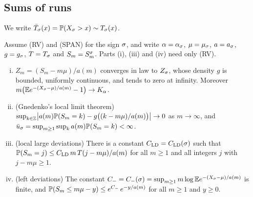 \subsection{Sums of runs}\label{sec:bulk-inputs}

We write $\bar T_\sigma(x)=\mathbb{P}(X_\sigma>x)\sim T_\sigma(x)$.

\begin{lemma}\label{lem:stable}
Assume (RV) and (SPAN) for the sign $\sigma$, and write $\alpha=\alpha_\sigma$,
$\mu=\mu_\sigma$, $a=a_\sigma$, $g=g_\sigma$, $T=T_\sigma$ and $S_m=S^\sigma_m$. Parts
(i), (iii) and (iv) need only (RV).
\begin{enumerate}[(i)]
\item $Z_m=(S_m-m\mu)/a(m)$ converges in law to $Z_\sigma$, whose density $g$ is
bounded, uniformly continuous, and tends to zero at infinity. Moreover
$m\bigl(\mathbb{E} e^{-(X_\sigma-\mu)/a(m)}-1\bigr)\to K_\alpha$.
\item (Gnedenko's local limit theorem)
$\sup_{k\in\mathbb{Z}}\bigl|a(m)\mathbb{P}(S_m=k)-g\bigl((k-m\mu)/a(m)\bigr)\bigr|\to0$ as $m\to\infty$,
and $\bar u_\sigma=\sup_{m\ge1}\sup_ka(m)\mathbb{P}(S_m=k)<\infty$.
\item (local large deviations) There is a constant $C_{\mathrm{LD}}=C_{\mathrm{LD}}(\sigma)$ such that
$\mathbb{P}(S_m=j)\le C_{\mathrm{LD}}\,m\,T(j-m\mu)/a(m)$
for all $m\ge1$ and all integers $j$ with $j-m\mu\ge1$.
\item (left deviations) The constant $C_-=C_-(\sigma)=\sup_{m\ge1}m\log\mathbb{E} e^{-(X_\sigma-\mu)/a(m)}$
is finite, and
$\mathbb{P}(S_m\le m\mu-y)\le e^{C_-}\,e^{-y/a(m)}$ for all $m\ge1$ and $y\ge0$.
\end{enumerate}
\end{lemma}

